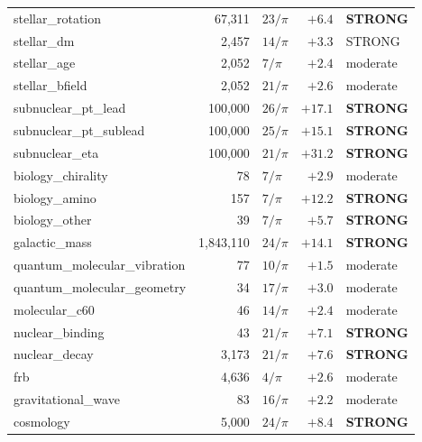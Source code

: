 \documentclass[11pt, letterpaper, openany]{book}
\begin{document}
\begin{longtable}{|l|r|l|r|l|}
\rowcolor{kishblue!4}
stellar\_rotation           & 67,311    & $23/\pi$ & $+6.4$   & \textbf{STRONG} \\
\rowcolor{goldseal!5}
stellar\_dm                 & 2,457     & $14/\pi$ & $+3.3$   & STRONG \\
\rowcolor{goldseal!4}
stellar\_age                & 2,052     & $7/\pi$  & $+2.4$   & moderate \\
\rowcolor{goldseal!4}
stellar\_bfield             & 2,052     & $21/\pi$ & $+2.6$   & moderate \\
\rowcolor{subnucleargold!7}
subnuclear\_pt\_lead        & 100,000   & $26/\pi$ & $+17.1$  & \textbf{STRONG} \\
\rowcolor{subnucleargold!7}
subnuclear\_pt\_sublead     & 100,000   & $25/\pi$ & $+15.1$  & \textbf{STRONG} \\
\rowcolor{subnucleargold!5}
subnuclear\_eta             & 100,000   & $21/\pi$ & $+31.2$  & \textbf{STRONG} \\
\rowcolor{backbonegreen!4}
biology\_chirality          & 78        & $7/\pi$  & $+2.9$   & moderate \\
\rowcolor{backbonegreen!4}
biology\_amino              & 157       & $7/\pi$  & $+12.2$  & \textbf{STRONG} \\
\rowcolor{backbonegreen!3}
biology\_other              & 39        & $7/\pi$  & $+5.7$   & \textbf{STRONG} \\
\rowcolor{kishblue!3}
galactic\_mass              & 1,843,110 & $24/\pi$ & $+14.1$  & \textbf{STRONG} \\
\rowcolor{violet!4}
quantum\_molecular\_vibration & 77      & $10/\pi$ & $+1.5$   & moderate \\
\rowcolor{violet!3}
quantum\_molecular\_geometry  & 34      & $17/\pi$ & $+3.0$   & moderate \\
\rowcolor{violet!3}
molecular\_c60              & 46        & $14/\pi$ & $+2.4$   & moderate \\
\rowcolor{orange!3}
nuclear\_binding            & 43        & $21/\pi$ & $+7.1$   & \textbf{STRONG} \\
\rowcolor{orange!3}
nuclear\_decay              & 3,173     & $21/\pi$ & $+7.6$   & \textbf{STRONG} \\
\rowcolor{goldseal!3}
frb                         & 4,636     & $4/\pi$  & $+2.6$   & moderate \\
\rowcolor{goldseal!3}
gravitational\_wave         & 83        & $16/\pi$ & $+2.2$   & moderate \\
\rowcolor{kishblue!3}
cosmology                   & 5,000     & $24/\pi$ & $+8.4$   & \textbf{STRONG} \\

\end{longtable}
\end{document}
